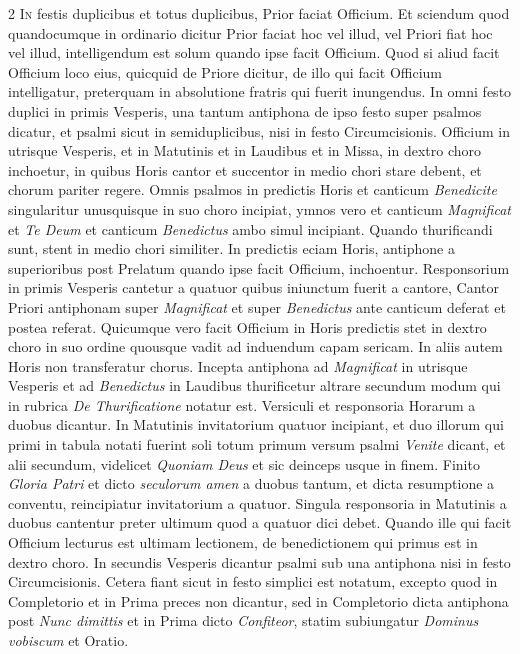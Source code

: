 \begin{multicols*}{2}
{\color{Red} }
\lettrine[lines=2]{\zallmancaps \color{Red} I}{n} festis duplicibus et totus duplicibus, Prior faciat Officium. Et sciendum quod quandocumque in ordinario dicitur Prior faciat hoc vel illud, vel Priori fiat hoc vel illud, intelligendum est solum quando ipse facit Officium. Quod si aliud facit Officium loco eius, quicquid de Priore dicitur, de illo qui facit Officium intelligatur, preterquam in absolutione fratris qui fuerit inungendus.
In omni festo duplici in primis Vesperis, una tantum antiphona de ipso festo super psalmos dicatur, et psalmi sicut in semiduplicibus, nisi in festo Circumcisionis. Officium in utrisque Vesperis, et in Matutinis et in Laudibus et in Missa, in dextro choro inchoetur, in quibus Horis cantor et succentor in medio chori stare debent, et chorum pariter regere. Omnis psalmos in predictis Horis et canticum \textit{Benedicite} singularitur unusquisque in suo choro incipiat, ymnos vero et canticum \textit{Magnificat} et \textit{Te Deum} et canticum \textit{Benedictus} ambo simul incipiant. Quando thurificandi sunt, stent in medio chori similiter. In predictis eciam Horis, antiphone a superioribus post Prelatum quando ipse facit Officium, inchoentur. Responsorium in primis Vesperis cantetur a quatuor quibus iniunctum fuerit a cantore, Cantor Priori antiphonam super \textit{Magnificat} et super \textit{Benedictus} ante canticum deferat et postea referat. Quicumque vero facit Officium in Horis predictis stet in dextro choro in suo ordine quousque vadit ad induendum capam sericam. In aliis autem Horis non transferatur chorus. Incepta antiphona ad \textit{Magnificat} in utrisque Vesperis et ad \textit{Benedictus} in Laudibus thurificetur altrare secundum modum qui in rubrica \textit{De Thurificatione} notatur est.
Versiculi et responsoria Horarum a duobus dicantur. In Matutinis invitatorium quatuor incipiant, et duo illorum qui primi in tabula notati fuerint soli totum primum versum psalmi \textit{Venite} dicant, et alii secundum, videlicet \textit{Quoniam Deus} et sic deinceps usque in finem.
Finito \textit{Gloria Patri} et dicto \textit{seculorum amen} a duobus tantum, et dicta resumptione a conventu, reincipiatur invitatorium a quatuor.
Singula responsoria in Matutinis a duobus cantentur preter ultimum quod a quatuor dici debet. Quando ille qui facit Officium lecturus est ultimam lectionem, de benedictionem qui primus est in dextro choro. In secundis Vesperis dicantur psalmi sub una antiphona nisi in festo Circumcisionis.
Cetera fiant sicut in festo simplici est notatum, excepto quod in Completorio et in Prima preces non dicantur, sed in Completorio dicta antiphona post \textit{Nunc dimittis} et in Prima dicto \textit{Confiteor}, statim subiungatur \textit{Dominus vobiscum} et Oratio.


\end{multicols*}
